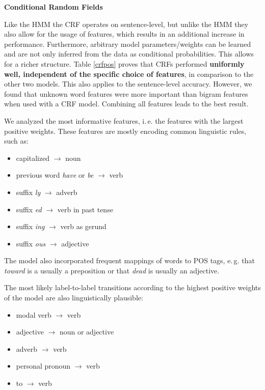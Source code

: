 \documentclass[twocolumns]{IEEEtran}
\begin{document}
\vspace*{3mm}
\colorbox{gray!30}{\textbf{Conditional Random Fields}}

Like the HMM the CRF operates on sentence-level, but unlike the HMM they also allow for the usage of features, which results in an additional increase in performance. Furthermore, arbitrary model parameters/weights can be learned and are not only inferred from the data as conditional probabilities. This allows for a richer structure. Table \ref{crfpos} proves that CRFs performed \textbf{uniformly well, independent of the specific choice of features}, in comparison to the other two models. This also applies to the sentence-level accuracy. However, we found that unknown word features were more important than bigram features when used with a CRF model. Combining all features leads to the best result.

We analyzed the most informative features, i.\,e. the features with the largest positive weights. These features are mostly encoding common linguistic rules, such as:

\vspace*{2mm}
\begin{itemize}
    \item capitalized $\longrightarrow$ noun
    \item previous word \textit{have} or \textit{be} $\longrightarrow$ verb
    \item suffix \textit{ly} $\longrightarrow$ adverb
    \item suffix \textit{ed} $\longrightarrow$ verb in past tense
    \item suffix \textit{ing} $\longrightarrow$ verb as gerund
    \item suffix \textit{ous} $\longrightarrow$ adjective
\end{itemize}
\vspace*{2mm}

The model also incorporated frequent mappings of words to POS tags, e.\,g. that \textit{toward} is a usually a preposition or that \textit{dead} is usually an adjective.

The most likely label-to-label transitions according to the highest positive weights of the model are also linguistically plausible:

\vspace*{2mm}
\begin{itemize}
    \item modal verb $\longrightarrow$ verb
    \item adjective $\longrightarrow$ noun or adjective
    \item adverb $\longrightarrow$ verb
    \item personal pronoun $\longrightarrow$ verb
    \item to $\longrightarrow$ verb
\end{itemize}
\vspace*{2mm}
\end{document}
